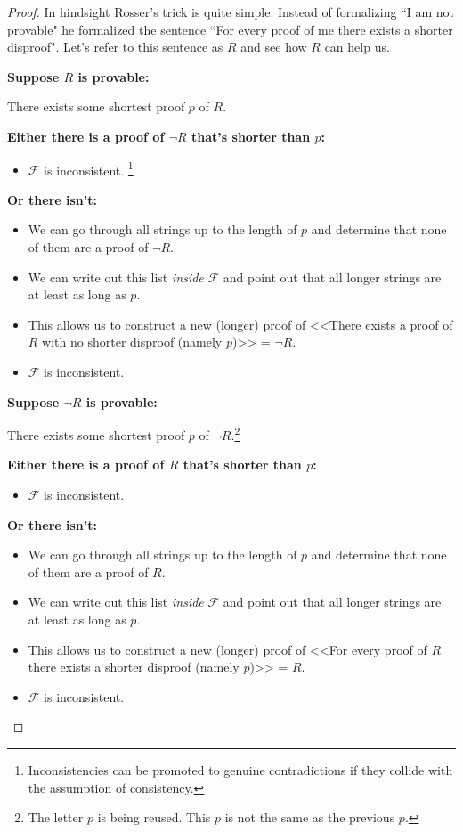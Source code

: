 \documentclass{article}
\theoremstyle{theorem}
\newcommand{\nameditem}[1]{\item\textbf{#1}}
\newcommand{\impl}{\item[$\Rightarrow$]}
\begin{document}
\begin{proof}
In hindsight Rosser's trick is quite simple. Instead of formalizing ``I am not provable" he formalized the sentence ``For every proof of me there exists a shorter disproof". Let's refer to this sentence as $R$ and see how $R$ can help us.
\begin{description}
\nameditem{Suppose $R$ is provable:}
\begin{description}
\impl There exists some shortest proof $p$ of $R$.
\nameditem{Either there is a proof of $\neg R$ that's shorter than $p$:}
\begin{itemize}
\impl $\mathcal{F}$ is inconsistent. \lightning\footnote{Inconsistencies can be promoted to genuine contradictions if they collide with the assumption of consistency.}
\end{itemize}
\nameditem{Or there isn't:}
\begin{itemize}
\impl We can go through all strings up to the length of $p$ and determine that none of them are a proof of $\neg R$.
\impl We can write out this list \textit{inside} $\mathcal{F}$ and point out that all longer strings are at least as long as $p$.
\impl This allows us to construct a new (longer) proof of <<There exists a proof of $R$ with no shorter disproof (namely $p$)>> = $\neg R$.
\impl $\mathcal{F}$ is inconsistent. \lightning
\end{itemize}
\end{description}
\nameditem{Suppose $\neg R$ is provable:}
\begin{description}
\impl There exists some shortest proof $p$ of $\neg R$.\footnote{The letter $p$ is being reused. This $p$ is not the same as the previous $p$.}
\nameditem{Either there is a proof of $R$ that's shorter than $p$:}
\begin{itemize}
\impl $\mathcal{F}$ is inconsistent. \lightning
\end{itemize}
\nameditem{Or there isn't:}
\begin{itemize}
\impl We can go through all strings up to the length of $p$ and determine that none of them are a proof of $R$.
\impl We can write out this list \textit{inside} $\mathcal{F}$ and point out that all longer strings are at least as long as $p$.
\impl This allows us to construct a new (longer) proof of <<For every proof of $R$ there exists a shorter disproof (namely $p$)>> = $R$.
\impl $\mathcal{F}$ is inconsistent. \lightning
\end{itemize}
\end{description}
\end{description}
\end{proof}
\end{document}
